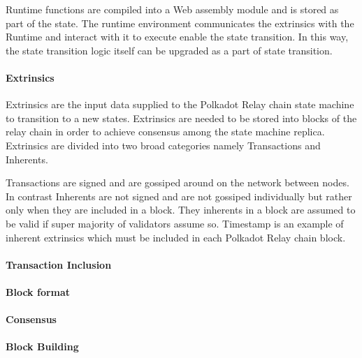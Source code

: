 Runtime functions are compiled into a Web assembly module and is stored as part of the state. The runtime environment communicates the extrinsics with the Runtime and interact with it to execute enable the state transition. In this way, the state transition logic itself can be upgraded as a part of state transition.

\paragraph{Extrinsics}

Extrinsics are the input data supplied to the Polkadot Relay chain state machine to transition to a new states. Extrinsics are needed to be stored into blocks of the relay chain in order to achieve consensus among the state machine replica. Extrinsics are divided into two broad categories namely Transactions and Inherents.

Transactions are signed and are gossiped around on the network between nodes. In contrast Inherents are not signed and are not gossiped individually but rather only when they are included in a block. They inherents in a block are assumed to be valid if super majority of validators assume so. Timestamp is an example of inherent extrinsics which must be included in each Polkadot Relay chain block.

\paragraph{Transaction Inclusion}

\paragraph{Block format}

\paragraph{Consensus}

\paragraph{Block Building}\label{sec:relaychainblockproduction}
 
